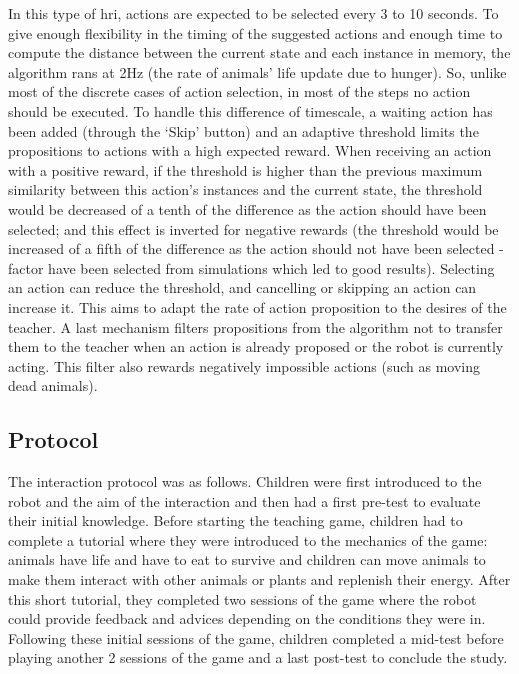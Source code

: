 In this type of \gls{hri}, actions are expected to be selected every 3 to 10 seconds. To give enough flexibility in the timing of the suggested actions and enough time to compute the distance between the current state and each instance in memory, the algorithm rans at 2Hz (the rate of animals' life update due to hunger). So, unlike most of the discrete cases of action selection, in most of the steps no action should be executed. To handle this difference of timescale, a waiting action has been added (through the `Skip' button) and an adaptive threshold limits the propositions to actions with a high expected reward. When receiving an action with a positive reward, if the threshold is higher than the previous maximum similarity between this action's instances and the current state, the threshold would be decreased of a tenth of the difference as the action should have been selected; and this effect is inverted for negative rewards (the threshold would be increased of a fifth of the difference as the action should not have been selected - factor have been selected from simulations which led to good results). Selecting an action can reduce the threshold, and cancelling or skipping an action can increase it. This aims to adapt the rate of action proposition to the desires of the teacher. A last mechanism filters propositions from the algorithm not to transfer them to the teacher when an action is already proposed or the robot is currently acting. This filter also rewards negatively impossible actions (such as moving dead animals).

\subsection{Protocol}

The interaction protocol was as follows. Children were first introduced to the robot and the aim of the interaction and then had a first pre-test to evaluate their initial knowledge. Before starting the teaching game, children had to complete a tutorial where they were introduced to the mechanics of the game: animals have life and have to eat to survive and children can move animals to make them interact with other animals or plants and replenish their energy. After this short tutorial, they completed two sessions of the game where the robot could provide feedback and advices depending on the conditions they were in. Following these initial sessions of the game, children completed a mid-test before playing another 2 sessions of the game and a last post-test to conclude the study. 

